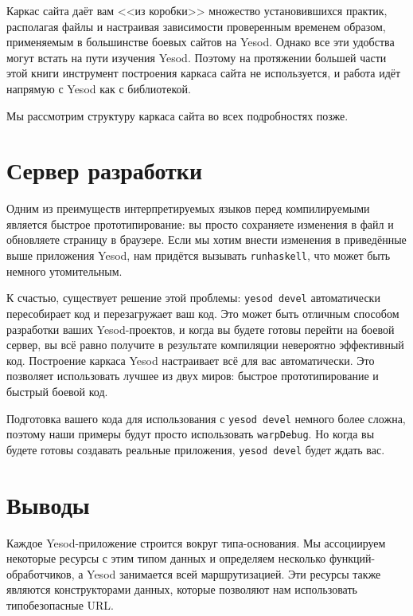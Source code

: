 Каркас сайта даёт вам <<из коробки>> множество установившихся практик, располагая файлы и
настраивая зависимости проверенным временем образом, применяемым в большинстве боевых
сайтов на Yesod. Однако все эти удобства могут встать на пути изучения Yesod. Поэтому на
протяжении большей части этой книги инструмент построения каркаса сайта не используется, и
работа идёт напрямую с Yesod как с библиотекой.

Мы рассмотрим структуру каркаса сайта во всех подробностях позже.

\section{Сервер разработки}

Одним из преимуществ интерпретируемых языков перед компилируемыми является быстрое
прототипирование: вы просто сохраняете изменения в файл и обновляете страницу в
браузере. Если мы хотим внести изменения в приведённые выше приложения Yesod, нам придётся
вызывать \lstinline!runhaskell!, что может быть немного утомительным.

К счастью, существует решение этой проблемы: \lstinline'yesod devel' автоматически
пересобирает код и перезагружает ваш код. Это может быть отличным способом разработки
ваших Yesod-проектов, и когда вы будете готовы перейти на боевой сервер, вы всё равно
получите в результате компиляции невероятно эффективный код. Построение каркаса Yesod
настраивает всё для вас автоматически. Это позволяет использовать лучшее из двух миров:
быстрое прототипирование и быстрый боевой код.

Подготовка вашего кода для использования с \lstinline!yesod devel! немного более сложна,
поэтому наши примеры будут просто использовать \lstinline!warpDebug!. Но когда вы будете
готовы создавать реальные приложения, \lstinline'yesod devel' будет ждать вас.

\section{Выводы}

Каждое Yesod-приложение строится вокруг типа-основания.  Мы ассоциируем некоторые ресурсы
с этим типом данных и определяем несколько функций-обработчиков, а Yesod занимается всей
маршрутизацией. Эти ресурсы также являются конструкторами данных, которые позволяют нам
использовать типобезопасные URL.

